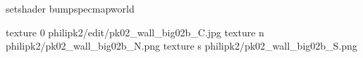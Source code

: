 setshader bumpspecmapworld

texture 0 philipk2/edit/pk02_wall_big02b_C.jpg
texture n philipk2/pk02_wall_big02b_N.png
texture s philipk2/pk02_wall_big02b_S.png

